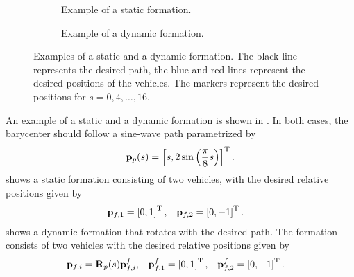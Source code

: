 \begin{figure}[t]
    \centering
    \begin{subfigure}{0.48\textwidth}
        \centering
                
        \vspace*{-1.75em}
        \caption{Example of a static formation.}
        \label{fig:background_formation_static}
    \end{subfigure}
    \begin{subfigure}{0.48\textwidth}
        \centering
                
        \vspace*{-1.75em}
        \caption{Example of a dynamic formation.}
        \label{fig:background_formation_dynamic}
    \end{subfigure}
    \vspace*{-0.5em}
    \caption{Examples of a static and a dynamic formation. The black line represents the desired path, the blue and red lines represent the desired positions of the vehicles. The markers represent the desired positions for $s = 0, 4, \ldots, 16$.}
    \label{fig:background_formation}
\end{figure}

An example of a static and a dynamic formation is shown in .
In both cases, the barycenter should follow a sine-wave path parametrized by
\begin{equation}
    \mathbf{p}_p(s) = \left[s, 2 \sin\left(\frac{\pi}{8} s\right)\right]^{\mathrm{T}}.
\end{equation}
 shows a static formation consisting of two vehicles, with the desired relative positions given by
\begin{align}
    \mathbf{p}_{f,1} &= \left[0, 1\right]^{\mathrm{T}}, &
    \mathbf{p}_{f,2} &= \left[0, -1\right]^{\mathrm{T}}.
\end{align}
 shows a dynamic formation that rotates with the desired path.
The formation consists of two vehicles with the desired relative positions given by
\begin{align}
    \mathbf{p}_{f, i} &= \mathbf{R}_p(s) \mathbf{p}_{f, i}^f, &
    \mathbf{p}_{f,1}^f &= \left[0, 1\right]^{\mathrm{T}}, &
    \mathbf{p}_{f,2}^f &= \left[0, -1\right]^{\mathrm{T}}.
\end{align}
